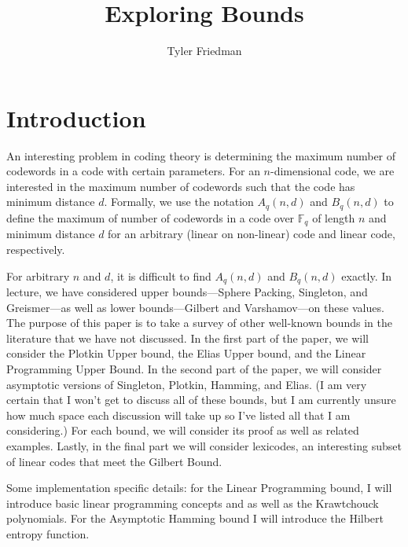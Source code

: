 \documentclass{article}
\title{Exploring Bounds}
\author{Tyler Friedman}
\numberwithin{theorem}{subsection}
\numberwithin{lemma}{subsection}
\theoremstyle{definition}
\numberwithin{exmp}{subsection}
\theoremstyle{definition}
\numberwithin{defn}{subsection}
\theoremstyle{definition}
\numberwithin{claim}{subsection}
\begin{document}
\maketitle

\section{Introduction}

An interesting problem in coding theory is determining the maximum
number of codewords in a code with certain parameters.  For an $n$-dimensional code, we are interested in 
the maximum number of codewords such that the code has minimum distance $d$.  
Formally, we use the notation $A_q(n,d)$
and $B_q(n,d)$ to define the maximum of number of codewords in a code over
$\mathbb{F}_q$ of length $n$ and minimum distance $d$ for an arbitrary (linear
on non-linear) code and linear code, respectively.  

For arbitrary $n$ and $d$, it is difficult to find $A_q(n,d)$ and $B_q(n,d)$ exactly.
 In lecture, we have considered upper bounds---Sphere Packing, Singleton, and Greismer---as well as
lower bounds---Gilbert and Varshamov---on these values.  The purpose of this
paper is to take a survey of other well-known bounds in the literature that we have not discussed.  
In the first part of the paper, we will consider the Plotkin Upper bound, 
the Elias Upper bound, and the Linear Programming Upper Bound.  In the second part of the paper, we will consider asymptotic versions
of Singleton, Plotkin, Hamming, and Elias.  (I am very certain that I won't get to discuss all of these bounds, but I am currently unsure how much space each discussion will take up so I've
listed all that I am considering.)  For each bound, we will consider its proof as well
as related examples.  Lastly, in the final part we will consider lexicodes, an interesting subset of linear codes that meet the Gilbert Bound.

Some implementation specific details: for the Linear Programming bound, I will introduce basic linear programming concepts and as well as the Krawtchouck polynomials.  For the 
Asymptotic Hamming bound I will introduce the Hilbert entropy function.  
\end{document}
